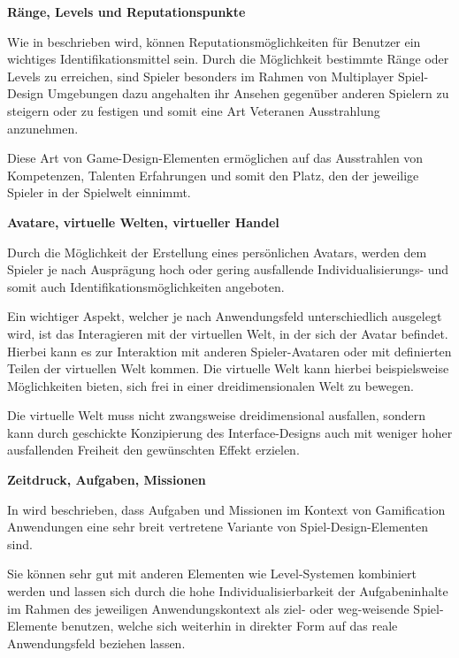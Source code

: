 \documentclass[bibliography=totoc,listof=totoc,BCOR=5mm,DIV=12,oneside]{scrbook}
\begin{document}
\par \bigskip \textbf{Ränge, Levels und Reputationspunkte}
\par Wie in \citep[Kapitel 4.5 Reputations, Ranks and Levels, Seite 75]{reeves2009total} beschrieben wird, können Reputationsmöglichkeiten für Benutzer ein wichtiges Identifikationsmittel sein. Durch die Möglichkeit bestimmte Ränge oder Levels zu erreichen, sind Spieler besonders im Rahmen von Multiplayer Spiel-Design Umgebungen dazu angehalten ihr Ansehen gegenüber anderen Spielern zu steigern oder zu festigen und somit eine Art Veteranen Ausstrahlung anzunehmen.
\par Diese Art von Game-Design-Elementen ermöglichen auf das Ausstrahlen von Kompetenzen, Talenten Erfahrungen und somit den Platz, den der jeweilige Spieler in der Spielwelt einnimmt.

\par \bigskip \textbf{Avatare, virtuelle Welten, virtueller Handel}
\par Durch die Möglichkeit der Erstellung eines persönlichen Avatars, werden dem Spieler je nach Ausprägung hoch oder gering ausfallende Individualisierungs- und somit auch Identifikationsmöglichkeiten angeboten. 
\par Ein wichtiger Aspekt, welcher je nach Anwendungsfeld unterschiedlich ausgelegt wird, ist das Interagieren mit der virtuellen Welt, in der sich der Avatar befindet. Hierbei kann es zur Interaktion mit anderen Spieler-Avataren oder mit definierten Teilen der virtuellen Welt kommen. Die virtuelle Welt kann hierbei beispielsweise Möglichkeiten bieten, sich frei in einer dreidimensionalen Welt zu bewegen. 
\par Die virtuelle Welt muss nicht zwangsweise dreidimensional ausfallen, sondern kann durch geschickte Konzipierung des Interface-Designs auch mit weniger hoher ausfallenden Freiheit den gewünschten Effekt erzielen.

\par \bigskip \textbf{Zeitdruck, Aufgaben, Missionen}
\par In \citep[Kapitel 6.1.1 Tasks]{pflanzl2018gamification} wird beschrieben, dass Aufgaben und Missionen im Kontext von Gamification Anwendungen eine sehr breit vertretene Variante von Spiel-Design-Elementen sind. 
\par Sie können sehr gut mit anderen Elementen wie Level-Systemen kombiniert werden und lassen sich durch die hohe Individualisierbarkeit der Aufgabeninhalte im Rahmen des jeweiligen Anwendungskontext als ziel- oder weg-weisende Spiel-Elemente benutzen, welche sich weiterhin in direkter Form auf das reale Anwendungsfeld beziehen lassen.
\end{document}

